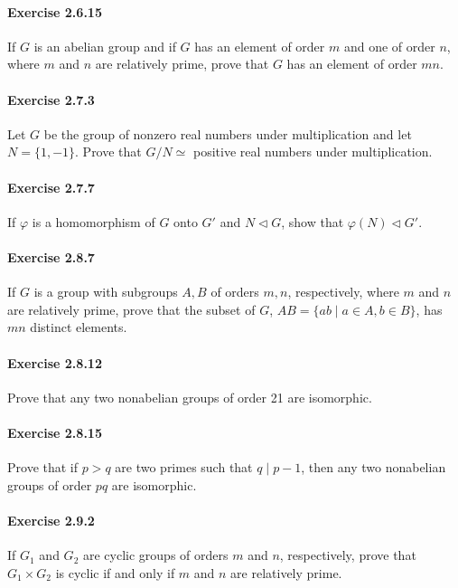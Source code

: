 \documentclass{article}
\begin{document}
\paragraph{Exercise 2.6.15} If $G$ is an abelian group and if $G$ has an element of order $m$ and one of order $n$, where $m$ and $n$ are relatively prime, prove that $G$ has an element of order $mn$.

\paragraph{Exercise 2.7.3} Let $G$ be the group of nonzero real numbers under multiplication and let $N = \{1, -1\}$. Prove that $G / N \simeq$ positive real numbers under multiplication.

\paragraph{Exercise 2.7.7} If $\varphi$ is a homomorphism of $G$ onto $G'$ and $N \triangleleft G$, show that $\varphi(N) \triangleleft G'$.

\paragraph{Exercise 2.8.7} If $G$ is a group with subgroups $A, B$ of orders $m, n$, respectively, where $m$ and $n$ are relatively prime, prove that the subset of $G$, $AB = \{ab \mid a \in A, b \in B\}$, has $mn$ distinct elements.

\paragraph{Exercise 2.8.12} Prove that any two nonabelian groups of order 21 are isomorphic.

\paragraph{Exercise 2.8.15} Prove that if $p > q$ are two primes such that $q \mid p - 1$, then any two nonabelian groups of order $pq$ are isomorphic.

\paragraph{Exercise 2.9.2} If $G_1$ and $G_2$ are cyclic groups of orders $m$ and $n$, respectively, prove that $G_1 \times G_2$ is cyclic if and only if $m$ and $n$ are relatively prime.
\end{document}

